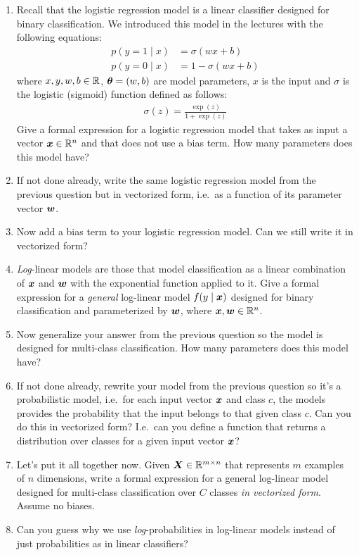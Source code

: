 \documentclass[11pt,a4paper]{article}
\begin{document}
\begin{enumerate}[label=(\alph*)]
    \item Recall that the logistic regression model is a linear classifier
          designed for binary classification. We introduced this model in the
          lectures with the following equations:
          \begin{align}
              p(y=1\mid x) & = \sigma(w x + b)     \\
              p(y=0\mid x) & = 1 - \sigma(w x + b)
          \end{align}
          where $x,y,w,b\in\mathbb{R}$, ${\boldsymbol{\theta}}=(w,b)$ are model parameters, $x$ is
          the input and $\sigma$ is the logistic (sigmoid) function defined
          as follows:
          \begin{align}\label{eq:sigmoid}
              \sigma(z) = \frac{\exp{(z)}}{1 + \exp{(z)}}
          \end{align}
          Give a formal expression for a logistic regression model that takes as
          input a vector ${\boldsymbol{x}}\in\mathbb{R}^n$ and that does not use a bias term.
          How many parameters does this model have?
    \item If not done already, write the same logistic regression model from the
          previous question but in vectorized form, i.e.\ as a function of its
          parameter vector ${\boldsymbol{w}}$.
    \item Now add a bias term to your logistic regression model. Can we still
          write it in vectorized form?
    \item \emph{Log}-linear models are those that model classification as a
          linear combination of ${\boldsymbol{x}}$ and ${\boldsymbol{w}}$ with the exponential function
          applied to it.
          Give a formal expression for a \emph{general} log-linear model
          $f(y\mid{\boldsymbol{x}})$ designed for binary classification and parameterized by
          ${\boldsymbol{w}}$, where ${\boldsymbol{x}},{\boldsymbol{w}}\in\mathbb{R}^n$.
    \item Now generalize your answer from the previous question so the model is
          designed for multi-class classification. How many parameters does this
          model have?
    \item If not done already, rewrite your model from the previous question so
          it's a probabilistic model, i.e.\ for each input vector ${\boldsymbol{x}}$ and
          class $c$, the models provides the probability that the input belongs 
          to that given class $c$. Can you do this in vectorized form? I.e.\ can 
          you define a function that returns a distribution over classes for a 
          given input vector ${\boldsymbol{x}}$?
    \item Let's put it all together now. Given ${\boldsymbol{X}}\in\mathbb{R}^{m\times n}$ that
          represents $m$ examples of $n$ dimensions, write a formal expression
          for a general log-linear model designed for multi-class classification
          over $C$ classes \emph{in vectorized form}. Assume no biases.
    \item Can you guess why we use \emph{log}-probabilities in log-linear models
          instead of just probabilities as in linear classifiers?
\end{enumerate}
\end{document}
